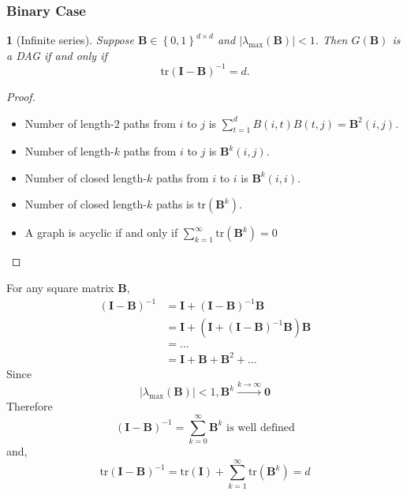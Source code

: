 \documentclass[10pt]{beamer}
\newcommand{\abs}[1]{\left\lvert#1\right\rvert}
\newcommand{\set}[1]{\left\{#1\right\}}
\newtheorem{proposition}[theorem]{\translate{Proposition}}
\begin{document}
\begin{frame}
    \frametitle{Binary Case}
    \begin{proposition}[Infinite series]
        Suppose $\bm{B} \in \set{0,1}^{d \times d}$ and $\abs{\lambda_{\max}(\bm{B})} < 1$. Then $G(\bm{B})$ is a DAG if and only if 
        \[
        \text{tr}(\mathbf{I} - \bm{B})^{-1} = d.
        \] 
    \end{proposition}
    \begin{proof}
        \begin{itemize}
            \item Number of length-$2$ paths from $i$ to $j$ is  $\sum^{d}_{t=1} B(i, t) B(t, j) = \bm{B}^{2}(i, j)$.
            \item Number of length-$k$ paths from $i$ to  $j$ is  $\bm{B}^{k}(i, j)$.
            \item Number of closed length-$k$ paths from $i$ to $i$ is $\bm{B}^{k}(i, i)$.
            \item Number of closed length-$k$ paths is  $\text{tr} (\bm{B}^{k})$.
            \item A graph is acyclic if and only if 
                $ \sum^{\infty}_{k=1} \text{tr}(\bm{B}^{k}) = 0$ 
        \end{itemize}

    \end{proof}
\end{frame}
\begin{frame}
    For any square matrix $\bm{B}$,
    \begin{align*}
        (\bm{I} - \bm{B})^{-1} 
        &= \bm{I} + (\bm{I} - \bm{B})^{-1} \bm{B} \\
        &= \bm{I} + (\bm{I} + (\bm{I}-\bm{B})^{-1}\bm{B}) \bm{B} \\
        &= \ldots  \\
        &= \bm{I}+ \bm{B} + \bm{B}^{2} + \ldots 
    \end{align*} 
    Since
    \[
    \abs{\lambda_{\max}(\bm{B})} < 1, \bm{B}^{k} \xrightarrow{k \to \infty} \textbf{0}
\]
    Therefore
    \[
    (\bm{I} - \bm{B})^{-1} = \sum^{\infty}_{k=0} \bm{B}^{k} \text{ is well defined}
    \] 
and,
    \[
    \text{tr}(\bm{I} - \bm{B})^{-1} = \text{tr}(\bm{I}) + \sum^{\infty}_{k=1} \text{tr}(\bm{B}^{k}) = d
    \] 
\end{frame}
\end{document}
